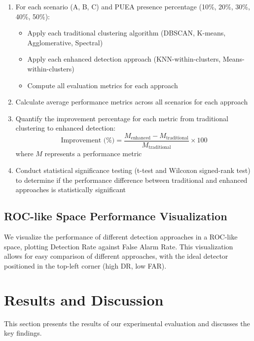 \documentclass[conference]{IEEEtran}
\begin{document}
\begin{enumerate}
    \item For each scenario (A, B, C) and PUEA presence percentage (10\%, 20\%, 30\%, 40\%, 50\%):
    \begin{itemize}
        \item Apply each traditional clustering algorithm (DBSCAN, K-means, Agglomerative, Spectral)
        \item Apply each enhanced detection approach (KNN-within-clusters, Means-within-clusters)
        \item Compute all evaluation metrics for each approach
    \end{itemize}
    
    \item Calculate average performance metrics across all scenarios for each approach
    
    \item Quantify the improvement percentage for each metric from traditional clustering to enhanced detection:
    \begin{equation}
    \text{Improvement (\%)} = \frac{M_{\text{enhanced}} - M_{\text{traditional}}}{M_{\text{traditional}}} \times 100
    \end{equation}
    where $M$ represents a performance metric
    
    \item Conduct statistical significance testing (t-test and Wilcoxon signed-rank test) to determine if the performance difference between traditional and enhanced approaches is statistically significant
\end{enumerate}

\subsection{ROC-like Space Performance Visualization}

We visualize the performance of different detection approaches in a ROC-like space, plotting Detection Rate against False Alarm Rate. This visualization allows for easy comparison of different approaches, with the ideal detector positioned in the top-left corner (high DR, low FAR).

\section{Results and Discussion}
\label{sec:results_discussion}

This section presents the results of our experimental evaluation and discusses the key findings.
\end{document}
